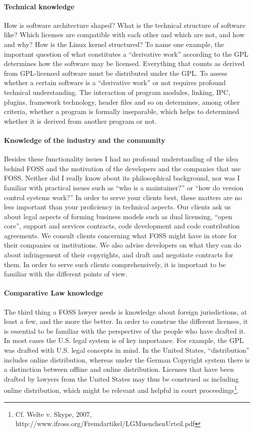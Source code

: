 \paragraph*{Technical knowledge}
How is software architecture shaped? What is the technical structure of software like? Which licenses are compatible with each other and which are not, and how and why? How is the Linux kernel structured? 
To name one example, the important question of what constitutes a “derivative work” according to the GPL determines how the software may be licensed. Everything that counts as derived from GPL-licensed software must be distributed under the GPL. To assess whether a certain software is a “derivative work” or not requires profound technical understanding. The interaction of program modules, linking, IPC, plugins, framework technology, header files and so on determines, among other criteria, whether a program is formally inseparable, which helps to determined whether it is derived from another program or not. 

\paragraph*{Knowledge of the industry and the community}
Besides these functionality issues I had no profound understanding of the idea behind FOSS and the motivation of the developers and the companies that use FOSS. Neither did I really know about its philosophical background, nor was I familiar with practical issues such as “who is a maintainer?” or “how do version control systems work?” In order to serve your clients best, these matters are no less important than your proficiency in technical aspects.  
Our clients ask us about legal aspects of forming business models such as dual licensing, “open core”, support and services contracts, code development and code contribution agreements. We consult clients concerning what FOSS might have in store for their companies or institutions. We also advise developers on what they can do about infringement of their copyrights, and draft and negotiate contracts for them. In order to serve such clients comprehensively, it is important to be familiar with the different points of view.  

\paragraph*{Comparative Law knowledge}
The third thing a FOSS lawyer needs is knowledge about foreign jurisdictions, at least a few, and the more the better. In order to construe the different licenses, it is essential to be familiar with the perspective of the people who have drafted it. In most cases the U.S. legal system is of key importance. For example, the GPL was drafted with U.S. legal concepts in mind. In the United States, “distribution” includes online distribution, whereas under the German Copyright system there is a distinction between offline and online distribution. Licenses that have been drafted by lawyers from the United States may thus be construed as including online distribution, which might be relevant and helpful in court proceedings\footnote{Cf. Welte v. Skype, 2007,  http://www.ifross.org/Fremdartikel/LGMuenchenUrteil.pdf}.
 
